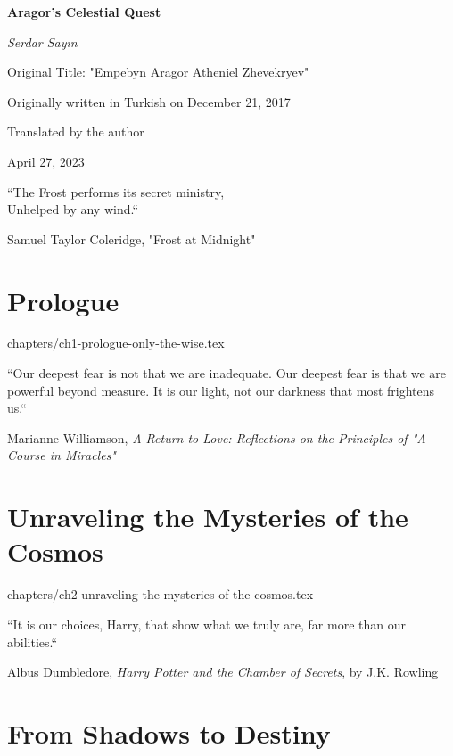 \documentclass[12pt, a4paper]{article}
\begin{document}
\begin{titlepage}
\begin{center}
  \vspace*{3cm}
  {\Huge\textbf{Aragor's Celestial Quest}\par}
  {\Large\textit{Serdar Sayın}\par}
  \vspace{1cm}
  {Original Title: "Empebyn Aragor Atheniel Zhevekryev"\par}
  \vspace{0.5cm}
   {Originally written in Turkish on December 21, 2017\par}
  \vspace{0.5cm}
  
  {Translated by the author\par} %
  \vspace{1cm}
  \doclicenseThis
  \vspace{1cm}
  {\large April 27, 2023\par} %

\end{center}
\end{titlepage}

\epigraph{``The Frost performs its secret ministry,\\Unhelped by any wind.``}{Samuel Taylor Coleridge, "Frost at Midnight"}

\section{Prologue}



\newpage
 {chapters/ch1-prologue-only-the-wise.tex}
\newpage

\epigraph{``Our deepest fear is not that we are inadequate. Our deepest fear is that we are powerful beyond measure. It is our light, not our darkness that most frightens us.``}{Marianne Williamson, \textit{A Return to Love: Reflections on the Principles of "A Course in Miracles"}}

\section{Unraveling the Mysteries of the Cosmos}

 {chapters/ch2-unraveling-the-mysteries-of-the-cosmos.tex}

\newpage
\epigraph{``It is our choices, Harry, that show what we truly are, far more than our abilities.``}{Albus Dumbledore, \textit{Harry Potter and the Chamber of Secrets}, by J.K. Rowling}

\section{From Shadows to Destiny}


\end{document}
